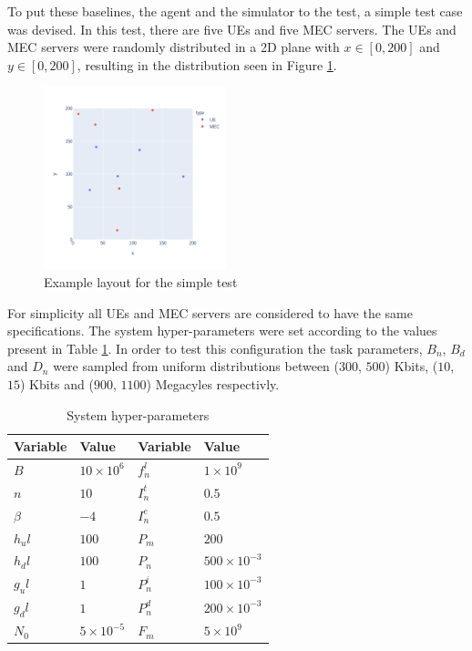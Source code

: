 To put these baselines, the agent and the simulator to the test, a simple test case was devised. In this test, there are five \acrshort{UE}s and five \acrshort{MEC} servers. The UEs and MEC servers were randomly distributed in a 2D plane with $x \in [0, 200]$ and $y \in [0, 200]$, resulting in the distribution seen in Figure \ref{example_layout}.

\begin{figure}[H]
  \centering
  \includegraphics[width=200px]{images/example_layout.png}
  \caption{Example layout for the simple test}  \label{example_layout}
\end{figure}

For simplicity all \acrshort{UE}s and \acrshort{MEC} servers are considered to have the same specifications. The system hyper-parameters were set according to the values present in Table \ref{hyperparams}. In order to test this configuration the task parameters, $B_n$, $B_d$ and $D_n$ were sampled from uniform distributions between ($300$, $500$) Kbits, ($10$, $15$) Kbits and ($900$, $1100$) Megacyles respectivly. 

\begin{table}[H]
\centering
\begin{tabular}{|l|l|l|l|}
\hline
Variable             & Value & Variable                & Value \\ \hline
$B$&$10\times10^{6}$&$f_n^l$&$1\times10^{9}$\\
$n$&$10$&$I_n^t$&$0.5$\\
$\beta$&$-4$&$I_n^e$&$0.5$\\
$h_ul$&$100$& $P_m$&$200$\\
$h_dl$&$100$& $P_n$& $500\times10^{-3}$\\
$g_ul$&$1$&$P_n^i$&$100\times10^{-3}$\\
$g_dl$&$1$&$P_n^d$&$200\times10^{-3}$\\
$N_0$&$5\times10^{-5}$&$F_m$&$5\times10^{9}$\\ \hline
\end{tabular}
\caption{System hyper-parameters}\label{hyperparams}
\end{table}

